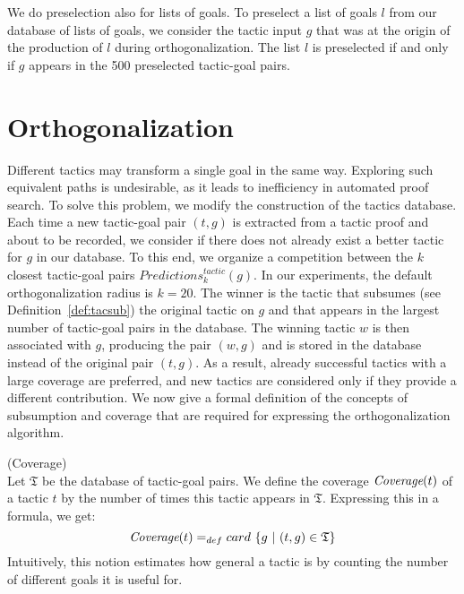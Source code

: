 \documentclass[runningheads,a4paper,draft]{svjour3}
\begin{document}
We do preselection also for lists of goals.
To preselect a list of goals $l$ from our database of lists of goals, we
consider the tactic input $g$ that was at the origin of the production of $l$
during orthogonalization. The list $l$ is preselected if and only if $g$
appears in the 500 preselected tactic-goal pairs.

\section{Orthogonalization}\label{sec:ortho}
Different tactics may transform a single goal in the same way. Exploring such
equivalent paths
is undesirable, as it leads to inefficiency in automated proof search.
To solve this problem, we modify the construction of the tactics database.
Each time a new tactic-goal pair $(t,g)$ is extracted from a tactic proof and
about to be recorded, we consider if there does not already exist a better
tactic for $g$ in our database. To this end, we organize a competition between
the
$k$ closest tactic-goal pairs $\mathit{Predictions}^{\mathit{tactic}}_k(g)$.
In our experiments,
the default orthogonalization radius is $k=20$.
The winner is the tactic that subsumes (see Definition~\ref{def:tacsub}) the
original tactic on $g$ and that
appears in the largest number of tactic-goal pairs in the database.
The winning tactic $w$ is then associated with $g$, producing the pair $(w,g)$
and is stored in the database instead of the original pair $(t,g)$.
As a result, already successful tactics with a large coverage are preferred,
and new tactics are considered only if they provide a different contribution.
We now give a formal definition of the concepts of subsumption and coverage
that are required for expressing the orthogonalization algorithm.

\begin{definition} (Coverage)\\
Let $\mathfrak{T}$ be the database of tactic-goal pairs. We define the
coverage $\textit{\mbox{Coverage}}(t)$ of a tactic $t$ by the number of times
this tactic
appears in
$\mathfrak{T}$. Expressing this in a formula, we get:
  \[\textit{\mbox{Coverage}}(t) =_{def} card\ \lbrace g\ |\ (t,g) \in
  \mathfrak{T} \rbrace \]
Intuitively, this notion estimates how general a tactic is by counting the
number of different goals it is useful for.
\end{definition}
\end{document}

